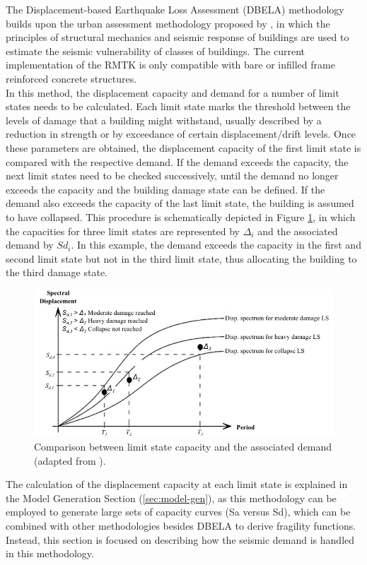 The Displacement-based Earthquake Loss Assessment (DBELA) methodology builds upon the urban assessment methodology proposed by \cite{Calvi1999}, in which the principles of structural mechanics and seismic response of buildings are used to estimate the seismic vulnerability of classes of buildings. The current implementation of the RMTK is only compatible with bare or infilled frame reinforced concrete structures.\\

In this method, the displacement capacity and demand for a number of limit states needs to be calculated. Each limit state marks the threshold between the levels of damage that a building might withstand, usually described by a reduction in strength or by exceedance of certain displacement/drift levels. Once these parameters are obtained, the displacement capacity of the first limit state is compared with the respective demand. If the demand exceeds the capacity, the next limit states need to be checked successively, until the demand no longer exceeds the capacity and the building damage state can be defined. If the demand also exceeds the capacity of the last limit state, the building is assumed to have collapsed. This procedure is schematically depicted in Figure \ref{fig:DBELA_scheme}, in which the capacities for three limit states are represented by $\Delta_i$ and the associated demand by $Sd_i$. In this example, the demand exceeds the capacity in the first and second limit state but not in the third limit state, thus allocating the building to the third damage state.

\begin{figure}[htb]
  \centering
      \includegraphics[width=12cm]{Figures/DBELA_scheme.png}
  \caption{Comparison between limit state capacity and the associated demand (adapted from \cite{BalEtAl2010}).}
  \label{fig:DBELA_scheme}
\end{figure}

The calculation of the displacement capacity at each limit state is explained in the Model Generation Section (\ref{sec:model-gen}), as this methodology can be employed to generate large sets of capacity curves (Sa versus Sd), which can be combined with other methodologies besides DBELA to derive fragility functions. Instead, this section is focused on describing how the seismic demand is handled in this methodology.\\ 

